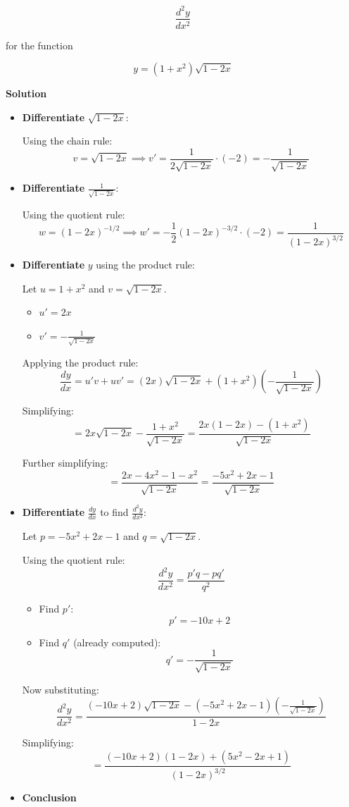 \documentclass[
]{book}
\providecommand{\tightlist}{%
  \setlength{\itemsep}{0pt}\setlength{\parskip}{0pt}}
\begin{document}
\[
\frac{d^2y}{dx^2}
\]

for the function

\[
y = (1 + x^2)\sqrt{1 - 2x}
\]

\textbf{Solution}

\begin{itemize}
\item
  \textbf{Differentiate} \(\sqrt{1 - 2x}\):

  Using the chain rule: \[
  v = \sqrt{1 - 2x} \implies v' = \frac{1}{2\sqrt{1 - 2x}} \cdot (-2) = -\frac{1}{\sqrt{1 - 2x}}
  \]
\item
  \textbf{Differentiate} \(\frac{1}{\sqrt{1 - 2x}}\):

  Using the quotient rule: \[
  w = (1 - 2x)^{-1/2} \implies w' = -\frac{1}{2}(1 - 2x)^{-3/2} \cdot (-2) = \frac{1}{(1 - 2x)^{3/2}}
  \]
\item
  \textbf{Differentiate} \(y\) using the product rule:

  Let \(u = 1 + x^2\) and \(v = \sqrt{1 - 2x}\).

  \begin{itemize}
  \tightlist
  \item
    \(u' = 2x\)
  \item
    \(v' = -\frac{1}{\sqrt{1 - 2x}}\)
  \end{itemize}

  Applying the product rule: \[
  \frac{dy}{dx} = u'v + uv' = (2x)\sqrt{1 - 2x} + (1 + x^2)\left(-\frac{1}{\sqrt{1 - 2x}}\right)
  \]

  Simplifying: \[
  = 2x\sqrt{1 - 2x} - \frac{1 + x^2}{\sqrt{1 - 2x}} = \frac{2x(1 - 2x) - (1 + x^2)}{\sqrt{1 - 2x}}
  \]

  Further simplifying: \[
  = \frac{2x - 4x^2 - 1 - x^2}{\sqrt{1 - 2x}} = \frac{-5x^2 + 2x - 1}{\sqrt{1 - 2x}}
  \]
\item
  \textbf{Differentiate} \(\frac{dy}{dx}\) to find
  \(\frac{d^2y}{dx^2}\):

  Let \(p = -5x^2 + 2x - 1\) and \(q = \sqrt{1 - 2x}\).

  Using the quotient rule: \[
  \frac{d^2y}{dx^2} = \frac{p'q - pq'}{q^2}
  \]

  \begin{itemize}
  \item
    Find \(p'\): \[
    p' = -10x + 2
    \]
  \item
    Find \(q'\) (already computed): \[
    q' = -\frac{1}{\sqrt{1 - 2x}}
    \]
  \end{itemize}

  Now substituting: \[
  \frac{d^2y}{dx^2} = \frac{(-10x + 2)\sqrt{1 - 2x} - (-5x^2 + 2x - 1)\left(-\frac{1}{\sqrt{1 - 2x}}\right)}{1 - 2x}
  \]

  Simplifying: \[
  = \frac{(-10x + 2)(1 - 2x) + (5x^2 - 2x + 1)}{(1 - 2x)^{3/2}}
  \]
\item
  \textbf{Conclusion}
\end{itemize}
\end{document}
